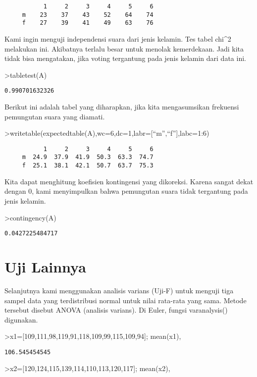 \documentclass[
]{book}
\begin{document}
\begin{verbatim}
           1     2     3     4     5     6
     m    23    37    43    52    64    74
     f    27    39    41    49    63    76
\end{verbatim}

Kami ingin menguji independensi suara dari jenis kelamin. Tes tabel chi\^{}2 melakukan ini. Akibatnya terlalu besar untuk menolak kemerdekaan. Jadi kita tidak bisa mengatakan, jika voting tergantung pada jenis kelamin dari data ini.

\textgreater tabletest(A)

\begin{verbatim}
0.990701632326
\end{verbatim}

Berikut ini adalah tabel yang diharapkan, jika kita mengasumsikan frekuensi pemungutan suara yang diamati.

\textgreater writetable(expectedtable(A),wc=6,dc=1,labr={[}``m'',``f''{]},labc=1:6)

\begin{verbatim}
           1     2     3     4     5     6
     m  24.9  37.9  41.9  50.3  63.3  74.7
     f  25.1  38.1  42.1  50.7  63.7  75.3
\end{verbatim}

Kita dapat menghitung koefisien kontingensi yang dikoreksi. Karena sangat dekat dengan 0, kami menyimpulkan bahwa pemungutan suara tidak tergantung pada jenis kelamin.

\textgreater contingency(A)

\begin{verbatim}
0.0427225484717
\end{verbatim}

\chapter{Uji Lainnya}\label{uji-lainnya}

Selanjutnya kami menggunakan analisis varians (Uji-F) untuk menguji tiga sampel data yang terdistribusi normal untuk nilai rata-rata yang sama. Metode tersebut disebut ANOVA (analisis varians). Di Euler, fungsi varanalysis() digunakan.

\textgreater x1={[}109,111,98,119,91,118,109,99,115,109,94{]}; mean(x1),

\begin{verbatim}
106.545454545
\end{verbatim}

\textgreater x2={[}120,124,115,139,114,110,113,120,117{]}; mean(x2),
\end{document}
